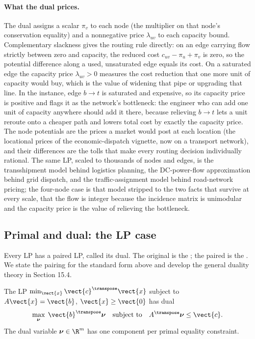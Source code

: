 \paragraph{What the dual prices.}
The dual assigns a scalar  $\pi_{v}$ to each node
(the multiplier on that node's conservation equality) and a nonnegative
price $\lambda_{uv}$ to each capacity bound. Complementary slackness
gives the routing rule directly: on an edge carrying flow strictly
between zero and capacity, the reduced cost $c_{uv} - \pi_{u} + \pi_{v}$
is zero, so the potential difference along a used, unsaturated edge
equals its cost. On a saturated edge the capacity price $\lambda_{uv} >
0$ measures the cost reduction that one more unit of capacity would buy,
which is the value of widening that pipe or upgrading that line. In the
instance, edge $b\!\to\!t$ is saturated and expensive, so its capacity
price is positive and flags it as the network's bottleneck: the engineer
who can add one unit of capacity anywhere should add it there, because
relieving $b\!\to\!t$ lets a unit reroute onto a cheaper path and lowers
total cost by exactly the capacity price. The node potentials are the
prices a market would post at each location (the locational prices of the
economic-dispatch vignette, now on a transport network), and their
differences are the tolls that make every routing decision individually
rational. The same LP, scaled to thousands of nodes and edges, is the
transshipment model behind logistics planning, the DC-power-flow
approximation behind grid dispatch, and the traffic-assignment model
behind road-network pricing; the four-node case is that model stripped
to the two facts that survive at every scale, that the flow is integer
because the incidence matrix is unimodular and the capacity price is the
value of relieving the bottleneck.

\subsection{Primal and dual: the LP case}

Every LP has a paired LP, called its dual. The original is the
; the paired is the . We state the
pairing for the standard form above and develop the general
duality theory in Section 15.4.

\begin{definition}
The LP $\min_{\vect{x}} \vect{c}^{\transpose} \vect{x}$ subject to
$A \vect{x} = \vect{b}$, $\vect{x} \geq \vect{0}$ has dual
\[
\max_{\boldsymbol{\nu}} \; \vect{b}^{\transpose}
\boldsymbol{\nu} \quad \text{subject to} \quad
A^{\transpose} \boldsymbol{\nu} \leq \vect{c}.
\]
The dual variable $\boldsymbol{\nu} \in \R^{m}$ has one component
per primal equality constraint.
\end{definition}

